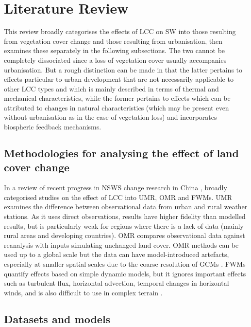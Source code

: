 \chapter{Literature Review}
\label{ch:litreview}

This review broadly categorises the effects of \ac{LCC} on \ac{SW} into those resulting from vegetation cover change and those resulting from urbanisation, then examines these separately in the following subsections. The two cannot be completely dissociated since a loss of vegetation cover usually accompanies urbanisation. But a rough distinction can be made in that the latter pertains to effects particular to urban development that are not necessarily applicable to other \ac{LCC} types and which is mainly described in terms of thermal and mechanical characteristics, while the former pertains to effects which can be attributed to changes in natural characteristics (which may be present even without urbanisation as in the case of vegetation loss) and incorporates biospheric feedback mechanisms.

\section[Methods for analysing land cover change]{Methodologies for analysing the effect of land cover change}

In a review of recent progress in \ac{NSWS} change research in China \citep{zha2021}, broadly categorised studies on the effect of \ac{LCC} into \ac{UMR}, \ac{OMR} and \acp{FWM}. \ac{UMR} examines the difference between observational data from urban and rural weather stations. As it uses direct observations, results have higher fidelity than modelled results, but is particularly weak for regions where there is a lack of data (mainly rural areas and developing countries). \ac{OMR} compares observational data against reanalysis with inputs simulating unchanged land cover. \ac{OMR} methods can be used up to a global scale but the data can have model-introduced artefacts, especially at smaller spatial scales due to the coarse resolution of \acp{GCM} \citep{zha2021}. \acp{FWM} quantify effects based on simple dynamic models, but it ignores important effects such as turbulent flux, horizontal advection, temporal changes in horizontal winds, and is also difficult to use in complex terrain \citep{zha2021}.

\section{Datasets and models}

